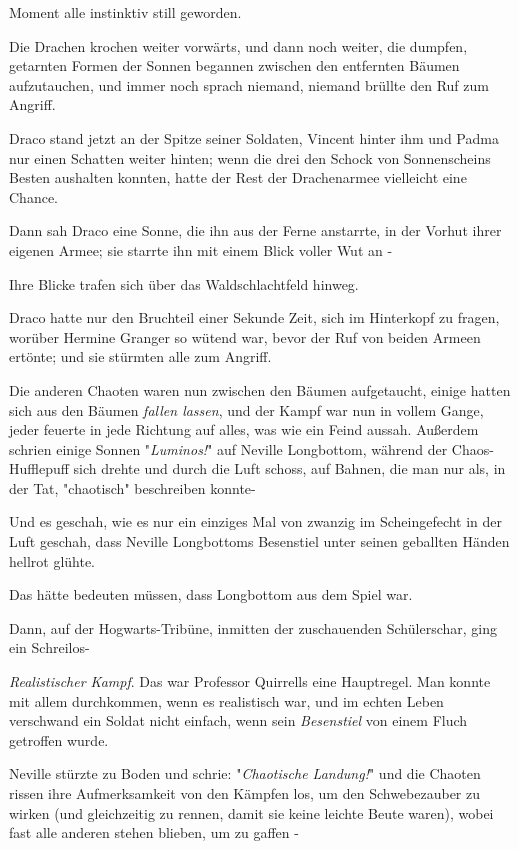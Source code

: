 {Moment alle instinktiv still geworden.

Die Drachen krochen weiter vorwärts, und dann noch weiter, die dumpfen, getarnten Formen der Sonnen begannen zwischen den entfernten Bäumen aufzutauchen, und immer noch sprach niemand, niemand brüllte den Ruf zum Angriff.

Draco stand jetzt an der Spitze seiner Soldaten, Vincent hinter ihm und Padma nur einen Schatten weiter hinten; wenn die drei den Schock von Sonnenscheins Besten aushalten konnten, hatte der Rest der Drachenarmee vielleicht eine Chance.

Dann sah Draco eine Sonne, die ihn aus der Ferne anstarrte, in der Vorhut ihrer eigenen Armee; sie starrte ihn mit einem Blick voller Wut an -

Ihre Blicke trafen sich über das Waldschlachtfeld hinweg.

Draco hatte nur den Bruchteil einer Sekunde Zeit, sich im Hinterkopf zu fragen, worüber Hermine Granger so wütend war, bevor der Ruf von beiden Armeen ertönte; und sie stürmten alle zum Angriff.

Die anderen Chaoten waren nun zwischen den Bäumen aufgetaucht, einige hatten sich aus den Bäumen \emph{fallen lassen}, und der Kampf war nun in vollem Gange, jeder feuerte in jede Richtung auf alles, was wie ein Feind aussah. Außerdem schrien einige Sonnen "\emph{Luminos!}" auf Neville Longbottom, während der Chaos-Hufflepuff sich drehte und durch die Luft schoss, auf Bahnen, die man nur als, in der Tat, "chaotisch" beschreiben konnte-

Und es geschah, wie es nur ein einziges Mal von zwanzig im Scheingefecht in der Luft geschah, dass Neville Longbottoms Besenstiel unter seinen geballten Händen hellrot glühte.

Das hätte bedeuten müssen, dass Longbottom aus dem Spiel war.

Dann, auf der Hogwarts-Tribüne, inmitten der zuschauenden Schülerschar, ging ein Schreilos-

\emph{Realistischer Kampf}. Das war Professor Quirrells eine Hauptregel. Man konnte mit allem durchkommen, wenn es realistisch war, und im echten Leben verschwand ein Soldat nicht einfach, wenn sein \emph{Besenstiel} von einem Fluch getroffen wurde.

Neville stürzte zu Boden und schrie: "\emph{Chaotische Landung!}" und die Chaoten rissen ihre Aufmerksamkeit von den Kämpfen los, um den Schwebezauber zu wirken (und gleichzeitig zu rennen, damit sie keine leichte Beute waren), wobei fast alle anderen stehen blieben, um zu gaffen -

}
